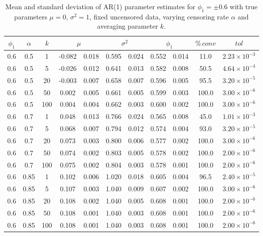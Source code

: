 \documentclass[twoside]{article}
\begin{document}
\begin{table}[htbp]
\begin{center}
\small
\caption{Mean and standard deviation of AR(1) parameter estimates for $\phi_1 = \pm0.6$ with true parameters $\mu=0$, $\sigma^2=1$, fixed uncensored data, varying censoring rate $\alpha$ and averaging parameter $k$.}
\label{tab:fixedAR12}
\begin{tabular}{|c|c|c|cc|cc|cc|c|c|}
\hline
$\phi_1$ & $\alpha$ & $k$ & \multicolumn{2}{c|}{$\mu$} & \multicolumn{2}{c|}{$\sigma^2$} & \multicolumn{2}{c|}{$\phi_1$} & $\%\,conv$ & $tol$ \\ \hline
0.6 & 0.5 & 1 & -0.082 & 0.018 & 0.595 & 0.024 & 0.552 & 0.014 & 11.0 & $2.23\times10^{-3}$ \\
0.6 & 0.5 & 5 & -0.026 & 0.012 & 0.641 & 0.013 & 0.582 & 0.008 & 50.5 & $4.64\times10^{-4}$ \\
0.6 & 0.5 & 20 & -0.003 & 0.007 & 0.658 & 0.007 & 0.596 & 0.005 & 95.5 & $3.20\times10^{-5}$ \\
0.6 & 0.5 & 50 & 0.002 & 0.005 & 0.661 & 0.005 & 0.599 & 0.003 & 100.0 & $3.00\times10^{-6}$ \\
0.6 & 0.5 & 100 & 0.004 & 0.004 & 0.662 & 0.003 & 0.600 & 0.002 & 100.0 & $3.00\times10^{-6}$ \\ \hline
0.6 & 0.7 & 1 & 0.048 & 0.013 & 0.766 & 0.024 & 0.565 & 0.008 & 45.0 & $1.01\times10^{-3}$ \\
0.6 & 0.7 & 5 & 0.068 & 0.007 & 0.794 & 0.012 & 0.574 & 0.004 & 93.0 & $3.20\times10^{-5}$ \\
0.6 & 0.7 & 20 & 0.073 & 0.003 & 0.800 & 0.006 & 0.577 & 0.002 & 100.0 & $3.00\times10^{-6}$ \\
0.6 & 0.7 & 50 & 0.074 & 0.002 & 0.803 & 0.005 & 0.578 & 0.002 & 100.0 & $2.00\times10^{-6}$ \\
0.6 & 0.7 & 100 & 0.075 & 0.002 & 0.804 & 0.003 & 0.578 & 0.001 & 100.0 & $2.00\times10^{-6}$ \\ \hline
0.6 & 0.85 & 1 & 0.102 & 0.006 & 1.020 & 0.018 & 0.605 & 0.004 & 96.5 & $2.40\times10^{-5}$ \\
0.6 & 0.85 & 5 & 0.107 & 0.003 & 1.040 & 0.009 & 0.607 & 0.002 & 100.0 & $3.00\times10^{-6}$ \\
0.6 & 0.85 & 20 & 0.108 & 0.002 & 1.040 & 0.005 & 0.608 & 0.001 & 100.0 & $2.00\times10^{-6}$ \\
0.6 & 0.85 & 50 & 0.108 & 0.001 & 1.040 & 0.003 & 0.608 & 0.001 & 100.0 & $2.00\times10^{-6}$ \\
0.6 & 0.85 & 100 & 0.108 & 0.001 & 1.040 & 0.003 & 0.608 & 0.001 & 100.0 & $2.00\times10^{-6}$ \\ \hline

\end{tabular}
\end{center}
\end{table}
\end{document}
